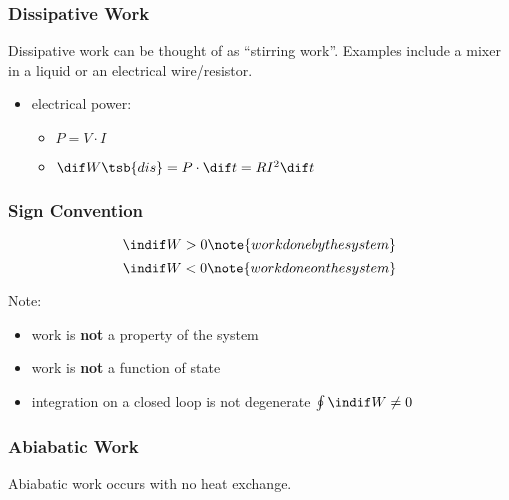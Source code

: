 \documentclass{article}
\begin{document}
\subsubsection{Dissipative Work}

Dissipative work can be thought of as ``stirring work''. Examples include a mixer in a liquid or an electrical wire/resistor.

\begin{itemize}
    \item electrical power:
    \begin{itemize}
        \item $P = V \cdot I$
        \item $\dif W\tsb{dis} = P \cdot \dif t = R I^2 \dif t$
    \end{itemize}
\end{itemize}

\subsubsection{Sign Convention}

\[ \indif W > 0 \note{work done by the system} \]
\[ \indif W < 0 \note{work done on the system} \]

Note:

\begin{itemize}
    \item work is \textbf{not} a property of the system
    \item work is \textbf{not} a function of state
    \item integration on a closed loop is not degenerate $\oint \indif W \neq 0$
\end{itemize}

\subsubsection{Abiabatic Work}

Abiabatic work occurs with no heat exchange.

\begin{center}
\end{center}
\end{document}
